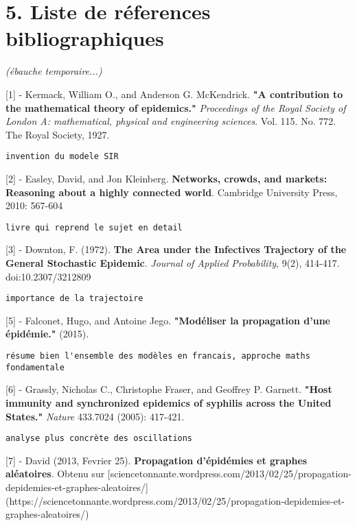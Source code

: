 \documentclass{article}
\begin{document}
\section*{5. Liste de réferences bibliographiques}

\textit{(ébauche temporaire...)}

[1] -  Kermack, William O., and Anderson G. McKendrick. \textbf{"A contribution to the mathematical theory of epidemics."} \textit{Proceedings of the Royal Society of London A: mathematical, physical and engineering sciences}. Vol. 115. No. 772. The Royal Society, 1927.


\begin{verbatim}
invention du modele SIR
\end{verbatim}


[2] -  Easley, David, and Jon Kleinberg. \textbf{Networks, crowds, and markets: Reasoning about a highly connected world}. Cambridge University Press, 2010: 567-604


\begin{verbatim}
livre qui reprend le sujet en detail
\end{verbatim}


[3] - Downton, F. (1972). \textbf{The Area under the Infectives Trajectory of the General Stochastic Epidemic}. \textit{Journal of Applied Probability}, 9(2), 414-417. doi:10.2307/3212809


\begin{verbatim}
importance de la trajectoire
\end{verbatim}


[5] - Falconet, Hugo, and Antoine Jego. \textbf{"Modéliser la propagation d’une épidémie."} (2015).


\begin{verbatim}
résume bien l'ensemble des modèles en francais, approche maths fondamentale
\end{verbatim}


[6] - Grassly, Nicholas C., Christophe Fraser, and Geoffrey P. Garnett. \textbf{"Host immunity and synchronized epidemics of syphilis across the United States."} \textit{Nature} 433.7024 (2005): 417-421.


\begin{verbatim}
analyse plus concrète des oscillations
\end{verbatim}


[7] - David (2013, Fevrier 25). \textbf{Propagation d'épidémies et graphes aléatoires}. Obtenu sur [sciencetonnante.wordpress.com/2013/02/25/propagation-depidemies-et-graphes-aleatoires/](https://sciencetonnante.wordpress.com/2013/02/25/propagation-depidemies-et-graphes-aleatoires/)
\end{document}
